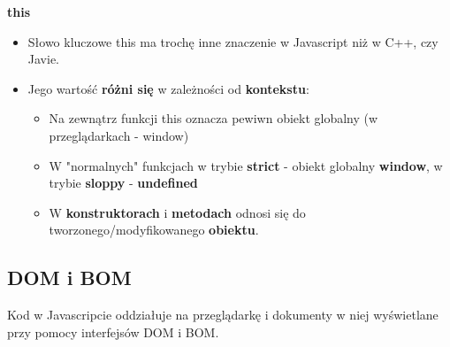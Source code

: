 \documentclass[../main.tex]{subfiles}
\begin{document}
    \textbf{this}
    \begin{itemize}
        \item Słowo kluczowe this ma trochę inne znaczenie w Javascript niż w C++, czy Javie.
        \item Jego wartość \textbf{różni się} w zależności od \textbf{kontekstu}:
        \begin{itemize}
            \item Na zewnątrz funkcji this oznacza pewiwn obiekt globalny (w przeglądarkach - window)
            \item W "normalnych" funkcjach w trybie \textbf{strict} - obiekt globalny \textbf{window}, w trybie \textbf{sloppy} - \textbf{undefined}
            \item W \textbf{konstruktorach} i \textbf{metodach} odnosi się do tworzonego/modyfikowanego \textbf{obiektu}.
        \end{itemize}
    \end{itemize}


    \subsection{DOM i BOM}
    Kod w Javascripcie oddziałuje na przeglądarkę i dokumenty w niej wyświetlane przy pomocy interfejsów DOM i BOM.
\end{document}

